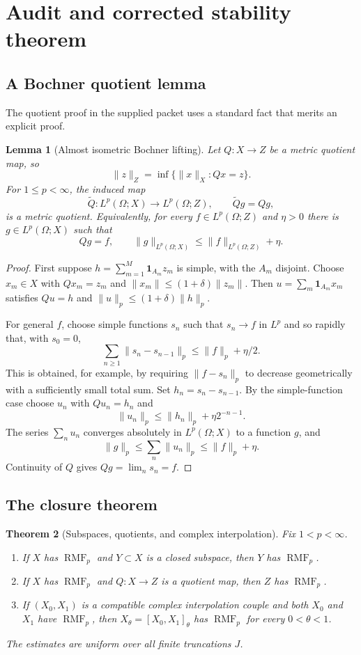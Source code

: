 \documentclass[11pt]{article}
\newtheorem{theorem}{Theorem}[section]
\newtheorem{lemma}[theorem]{Lemma}
\theoremstyle{definition}
\newcommand{\RMF}{\operatorname{RMF}}
\newcommand{\1}{\mathbf 1}
\begin{document}
\section{Audit and corrected stability theorem}

\subsection{A Bochner quotient lemma}

The quotient proof in the supplied packet uses a standard fact that merits an
explicit proof.

\begin{lemma}[Almost isometric Bochner lifting]\label{lem:bochner-lift}
Let $Q:X\to Z$ be a metric quotient map, so
\[
 \|z\|_Z=\inf\{\|x\|_X:Qx=z\}.
\]
For $1\le p<\infty$, the induced map
\[
 \widetilde Q:L^p(\Omega;X)\longrightarrow L^p(\Omega;Z),
 \qquad \widetilde Qg=Qg,
\]
is a metric quotient.  Equivalently, for every $f\in L^p(\Omega;Z)$ and
$\eta>0$ there is $g\in L^p(\Omega;X)$ such that
\[
 Qg=f,\qquad \|g\|_{L^p(\Omega;X)}\le \|f\|_{L^p(\Omega;Z)}+\eta.
\]
\end{lemma}

\begin{proof}
First suppose $h=\sum_{m=1}^M\1_{A_m}z_m$ is simple, with the $A_m$ disjoint.
Choose $x_m\in X$ with $Qx_m=z_m$ and
$\|x_m\|\le(1+\delta)\|z_m\|$.  Then
$u=\sum_m\1_{A_m}x_m$ satisfies $Qu=h$ and
$\|u\|_p\le(1+\delta)\|h\|_p$.

For general $f$, choose simple functions $s_n$ such that $s_n\to f$ in $L^p$
and so rapidly that, with $s_0=0$,
\[
 \sum_{n\ge1}\|s_n-s_{n-1}\|_p\le \|f\|_p+\eta/2.
\]
This is obtained, for example, by requiring
$\|f-s_n\|_p$ to decrease geometrically with a sufficiently small total sum.
Set $h_n=s_n-s_{n-1}$.  By the simple-function case choose $u_n$ with
$Qu_n=h_n$ and
\[
 \|u_n\|_p\le \|h_n\|_p+\eta 2^{-n-1}.
\]
The series $\sum_nu_n$ converges absolutely in $L^p(\Omega;X)$ to a function
$g$, and
\[
 \|g\|_p\le\sum_n\|u_n\|_p\le\|f\|_p+\eta.
\]
Continuity of $Q$ gives $Qg=\lim_ns_n=f$.
\end{proof}

\subsection{The closure theorem}

\begin{theorem}[Subspaces, quotients, and complex interpolation]
\label{thm:closure}
Fix $1<p<\infty$.
\begin{enumerate}[label=\textup{(\roman*)}]
\item If $X$ has $\RMF_p$ and $Y\subset X$ is a closed subspace, then $Y$ has
$\RMF_p$.
\item If $X$ has $\RMF_p$ and $Q:X\to Z$ is a quotient map, then $Z$ has
$\RMF_p$.
\item If $(X_0,X_1)$ is a compatible complex interpolation couple and both
$X_0$ and $X_1$ have $\RMF_p$, then
$X_\theta=[X_0,X_1]_\theta$ has $\RMF_p$ for every $0<\theta<1$.
\end{enumerate}
The estimates are uniform over all finite truncations $J$.
\end{theorem}
\end{document}
